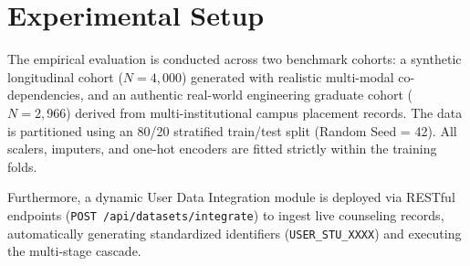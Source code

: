 \documentclass[conference]{IEEEtran}
\begin{document}
\begin{table}[htbp]
\caption{Hierarchical Three-Stage Cascade Performance Benchmarks ($N=4,000$ Synthetic Cohort, 80/20 Test Split)}
\label{tab:benchmarks}
\centering
{}
\end{table}

\section{Experimental Setup}
The empirical evaluation is conducted across two benchmark cohorts: a synthetic longitudinal cohort ($N=4,000$) generated with realistic multi-modal co-dependencies, and an authentic real-world engineering graduate cohort ($N=2,966$) derived from multi-institutional campus placement records. The data is partitioned using an 80/20 stratified train/test split (Random Seed = 42). All scalers, imputers, and one-hot encoders are fitted strictly within the training folds.

Furthermore, a dynamic User Data Integration module is deployed via RESTful endpoints (\texttt{POST /api/datasets/integrate}) to ingest live counseling records, automatically generating standardized identifiers (\texttt{USER\_STU\_XXXX}) and executing the multi-stage cascade.

\begin{table}[htbp]
\caption{Multi-Metric Validation on Authentic Engineering Cohort (Kaggle Benchmark, $N=2,966$)}
\label{tab:realdata}
\centering
{}
\end{table}
\end{document}
